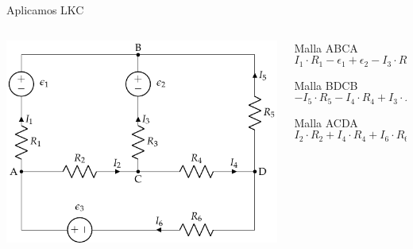\documentclass[xcolor={usenames,svgnames,dvipsnames}]{beamer}
\begin{document}
\begin{frame}[label={sec:orgc403f93}]{Aplicamos LKC}
\begin{columns}
\begin{column}{0.5\columnwidth}
\begin{center}
\includegraphics[width=.9\linewidth]{figs/mallas1.pdf}
\end{center}
\end{column}

\begin{column}{0.5\columnwidth}
Malla ABCA
\begin{equation*}
  I_1 \cdot R_1 - \epsilon_1 + \epsilon_2 - I_3 \cdot R_3 - I_2 \cdot R_2 = 0
\end{equation*}

Malla BDCB
\begin{equation*}
  -I_5 \cdot R_5 - I_4 \cdot R_4 + I_3 \cdot R_3 - \epsilon_2 = 0
\end{equation*}

Malla ACDA
\begin{equation*}
  I_2 \cdot R_2 + I_4 \cdot R_4 + I_6 \cdot R_6 - \epsilon_3 = 0
\end{equation*}
\end{column}
\end{columns}
\end{frame}
\end{document}
